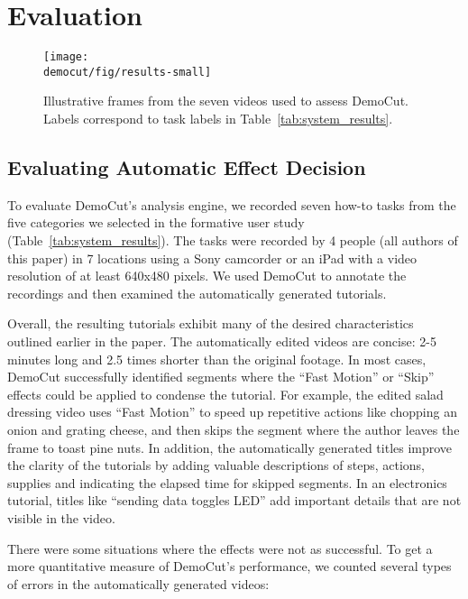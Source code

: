 \section{Evaluation}

\begin{figure}[t]
  \centering
  \texttt{[image: \\democut/fig/results-small]}
  \caption{Illustrative frames from the seven videos used to assess DemoCut. Labels correspond to task labels in Table~\ref{tab:system_results}.}
  \label{fig:results}
  \vspace{-0.2in}
\end{figure}

\subsection{Evaluating Automatic Effect Decision}

To evaluate DemoCut's analysis engine, we recorded seven how-to tasks
from the five categories we selected in the formative user study
(Table~\ref{tab:system_results}).
%
The tasks were recorded by 4 people (all authors of this
paper) in 7 locations using a Sony camcorder or an iPad with
a video resolution of at least 640x480 pixels.
%
We used DemoCut to annotate the recordings and then examined the
automatically generated tutorials.

Overall, the resulting tutorials exhibit many of the desired
characteristics outlined earlier in the paper.
%
The automatically edited videos are concise: 2-5 minutes long and 2.5
times shorter than the original footage.
%
In most cases, DemoCut successfully identified segments where the ``Fast
Motion'' or ``Skip'' effects could be applied to condense the tutorial.
%
For example, the edited salad dressing video uses ``Fast Motion'' to
speed up repetitive actions like chopping an onion and grating cheese,
and then skips the segment where the author leaves the frame to toast
pine nuts.
%
In addition, the automatically generated titles improve the clarity of
the tutorials by adding valuable descriptions of steps, actions,
supplies and indicating the elapsed time for skipped segments.
%
In an electronics tutorial, titles like ``sending data toggles LED''
add important details that are not visible in the video.

There were some situations where the effects were not as successful.
%
To get a more quantitative measure of DemoCut's performance, we
counted several types of errors in the automatically generated
videos:

